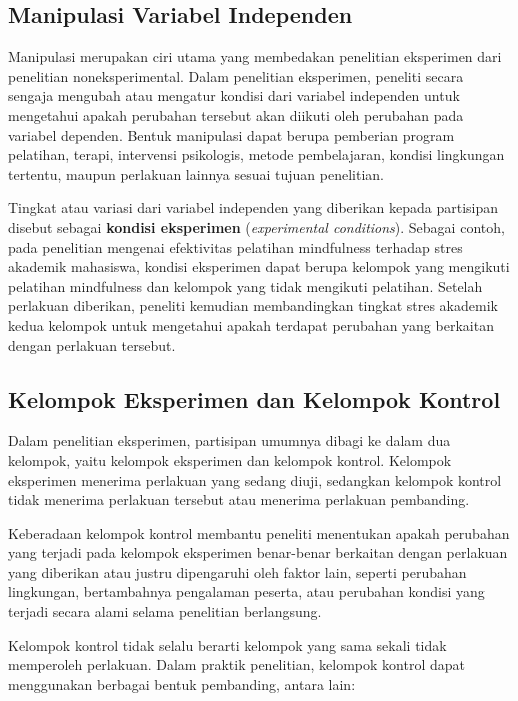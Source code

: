 \documentclass[
  indonesian,
  letterpaper,
  DIV=11,
  numbers=noendperiod]{scrreprt}
\begin{document}
\subsection{Manipulasi Variabel
Independen}\label{manipulasi-variabel-independen}

Manipulasi merupakan ciri utama yang membedakan penelitian eksperimen
dari penelitian noneksperimental. Dalam penelitian eksperimen, peneliti
secara sengaja mengubah atau mengatur kondisi dari variabel independen
untuk mengetahui apakah perubahan tersebut akan diikuti oleh perubahan
pada variabel dependen. Bentuk manipulasi dapat berupa pemberian program
pelatihan, terapi, intervensi psikologis, metode pembelajaran, kondisi
lingkungan tertentu, maupun perlakuan lainnya sesuai tujuan penelitian.

Tingkat atau variasi dari variabel independen yang diberikan kepada
partisipan disebut sebagai \textbf{kondisi eksperimen}
(\emph{experimental conditions}). Sebagai contoh, pada penelitian
mengenai efektivitas pelatihan mindfulness terhadap stres akademik
mahasiswa, kondisi eksperimen dapat berupa kelompok yang mengikuti
pelatihan mindfulness dan kelompok yang tidak mengikuti pelatihan.
Setelah perlakuan diberikan, peneliti kemudian membandingkan tingkat
stres akademik kedua kelompok untuk mengetahui apakah terdapat perubahan
yang berkaitan dengan perlakuan tersebut.

\subsection{Kelompok Eksperimen dan Kelompok
Kontrol}\label{kelompok-eksperimen-dan-kelompok-kontrol}

Dalam penelitian eksperimen, partisipan umumnya dibagi ke dalam dua
kelompok, yaitu kelompok eksperimen dan kelompok kontrol. Kelompok
eksperimen menerima perlakuan yang sedang diuji, sedangkan kelompok
kontrol tidak menerima perlakuan tersebut atau menerima perlakuan
pembanding.

Keberadaan kelompok kontrol membantu peneliti menentukan apakah
perubahan yang terjadi pada kelompok eksperimen benar-benar berkaitan
dengan perlakuan yang diberikan atau justru dipengaruhi oleh faktor
lain, seperti perubahan lingkungan, bertambahnya pengalaman peserta,
atau perubahan kondisi yang terjadi secara alami selama penelitian
berlangsung.

Kelompok kontrol tidak selalu berarti kelompok yang sama sekali tidak
memperoleh perlakuan. Dalam praktik penelitian, kelompok kontrol dapat
menggunakan berbagai bentuk pembanding, antara lain:
\end{document}
